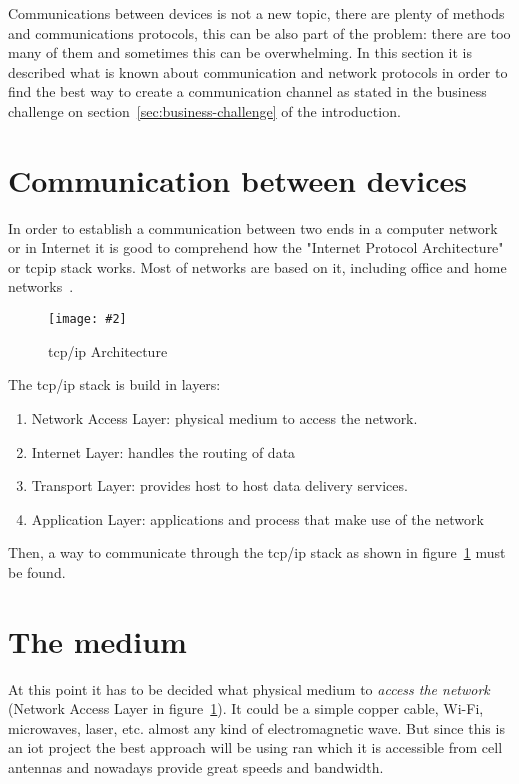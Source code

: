 \documentclass[hidelinks,11pt,a4paper,oneside,article]{memoir}
\newcommand{\putimage}[3][10] %
{
\begin{figure}[h]
	\centering
	\captionsetup{justification=centering}
	\texttt{[image: \#2]}
	\caption{#3}
	\label{fig:#2}
\end{figure}
}
\begin{document}
Communications between devices is not a new topic, there are plenty of methods and communications protocols, this can be also part of the problem: there are too many of them and sometimes this can be overwhelming. In this section it is described what is known about communication and network protocols in order to find the best way to create a communication channel as stated in the business challenge on section~\ref{sec:business-challenge} of the introduction.



\section{Communication between devices}
In order to establish a communication between two ends in a computer network or in Internet it is good to comprehend how the "Internet Protocol Architecture" or \gls{tcpip} stack works. Most of networks are based on it, including office and home networks~\cite[9]{tcpip}.

	\putimage[5]{tcpip}{\gls{tcp}/\gls{ip} Architecture}

The \gls{tcp}/\gls{ip} stack is build in layers:
\begin{enumerate}
	\item Network Access Layer: physical medium to access the network.
	\item Internet Layer: handles the routing of data
	\item Transport Layer: provides host to host data delivery services.
	\item Application Layer: applications and process that make use of the network
\end{enumerate}

Then, a way to communicate through the \gls{tcp}/\gls{ip} stack as shown in figure~\ref{fig:tcpip} must be found.

\section{The medium}\label{sec:the-medium}
At this point it has to be decided what physical medium to \textit{access the network} (Network Access Layer in figure~\ref{fig:tcpip}). It could be a simple copper cable, Wi-Fi, microwaves, laser, etc. almost any kind of electromagnetic wave. But since this is an \gls{iot} project the best approach will be using \gls{ran} which it is accessible from cell antennas and nowadays provide great speeds and bandwidth.
\end{document}
